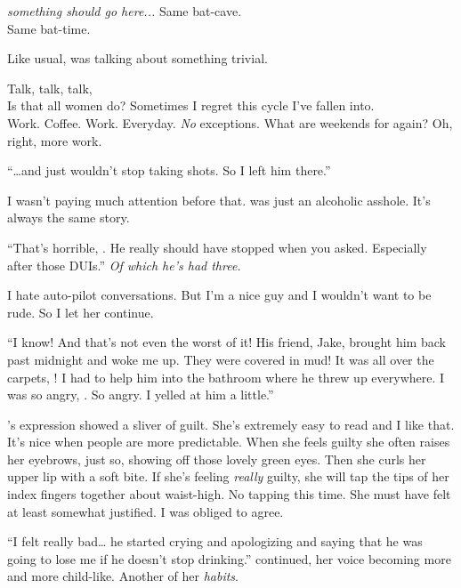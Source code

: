\textit{something should go here...}
\lhoarb
\noindent
Same bat-cave. \\
Same bat-time.
\VV


\noindent
Like usual, \april{} was talking about something trivial.
\VV


\noindent
Talk, talk, talk,
\\
Is that all women do?
Sometimes I regret this cycle I've fallen into.
\\
Work.  Coffee.  Work. Everyday. \textit{No} exceptions.
What are weekends for again?  Oh, right, more work.
\VV


``\ldots{}and \eric{} just wouldn't stop taking shots.  So I left him there.''
\VV


\noindent
I wasn't paying much attention before that.
\eric{} was just an alcoholic asshole.  It's always the same story.
\VV


``That's horrible, \april.  He really should have stopped when you asked.
Especially after those DUIs.'' \textit{Of which he's had three.}
\VV


\noindent
I hate auto-pilot conversations.
But I'm a nice guy and I wouldn't want to be rude.
So I let her continue.
\VV


``I know! And that's not even the worst of it!
His friend, Jake, brought him back past midnight and woke me up.
They were covered in mud!  It was all over the carpets, \josh!
I had to help him into the bathroom where he threw up everywhere.
I was so angry, \josh.  So angry.  I yelled at him a little.''
\VV


\noindent
\april's expression showed a sliver of guilt.
She's extremely easy to read and I like that.
It's nice when people are more predictable.
When she feels guilty she often raises her eyebrows, just so, showing off
those lovely green eyes.  Then she curls her upper lip with a soft bite.
If she's feeling \textit{really} guilty, she will tap the tips of her
index fingers together about waist-high.
No tapping this time.  She must have felt at least somewhat justified.
I was obliged to agree.
\VV


``I felt really bad\ldots{} he started crying and apologizing and saying that he
was going to lose me if he doesn't stop drinking.''
\april{} continued, her voice becoming more and more child-like.
Another of her \textit{habits}.
\VV


